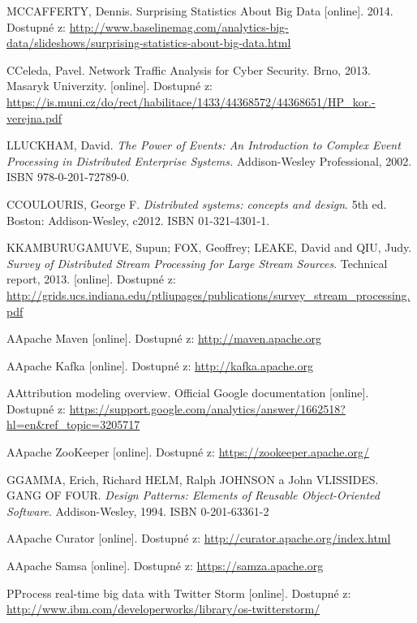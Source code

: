 \documentclass[
  digital, %
  table,   %
  nolof,     %
  nolot,     %
  oneside, %
  nocover,
  monochrome,
  12pt
]{fithesis3}
\begin{document}
\begin{thebibliography}{99}
\bibitem
MCCAFFERTY, Dennis. Surprising Statistics About Big Data [online]. 2014. Dostupné z: \url{http://www.baselinemag.com/analytics-big-data/slideshows/surprising-statistics-about-big-data.html} \label{bib_big_data}

\bibitem
CCeleda, Pavel. Network Traffic Analysis for Cyber Security. Brno, 2013. Masaryk Univerzity. [online]. Dostupné z: \url{https://is.muni.cz/do/rect/habilitace/1433/44368572/44368651/HP_kor.-verejna.pdf} \label{bib_celeda}

\bibitem
LLUCKHAM, David. \textit{The Power of Events: An Introduction to Complex
Event Processing in Distributed Enterprise Systems.} Addison-Wesley Professional, 2002. ISBN 978-0-201-72789-0. \label{bib_1}

\bibitem
CCOULOURIS, George F. \textit{Distributed systems: concepts and design}. 5th ed. Boston: Addison-Wesley, c2012. ISBN 01-321-4301-1. \label{bib_2}

\bibitem
KKAMBURUGAMUVE, Supun; FOX, Geoffrey; LEAKE, David and QIU, Judy. \textit{Survey of Distributed Stream Processing for Large Stream Sources}. Technical report, 2013. [online]. Dostupné z: \url{http://grids.ucs.indiana.edu/ptliupages/publications/survey_stream_processing.pdf} \label{bib_3}

\bibitem
AApache Maven [online]. Dostupné z: \url{http://maven.apache.org} \label{bib_4}

\bibitem
AApache Kafka [online]. Dostupné z: \url{http://kafka.apache.org} \label{bib_5}

\bibitem
AAttribution modeling overview. Official Google documentation [online]. Dostupné z: \url{https://support.google.com/analytics/answer/1662518?hl=en&ref_topic=3205717} \label{bib_6}

\bibitem
AApache ZooKeeper [online]. Dostupné z: \url{https://zookeeper.apache.org/} \label{bib_7}

\bibitem
GGAMMA, Erich, Richard HELM, Ralph JOHNSON a John VLISSIDES. GANG OF FOUR. \textit{Design Patterns: Elements of Reusable Object-Oriented Software}. Addison-Wesley, 1994. ISBN 0-201-63361-2 \label{bib_8}

\bibitem
AApache Curator [online]. Dostupné z: \url{http://curator.apache.org/index.html} \label{bib_9}

\bibitem
AApache Samsa [online]. Dostupné z: \url{https://samza.apache.org} \label{bib_samsa}

\bibitem
PProcess real-time big data with Twitter Storm [online]. Dostupné z: \url{http://www.ibm.com/developerworks/library/os-twitterstorm/} \label{bib_distributed_computing}


\end{thebibliography}
\end{document}
